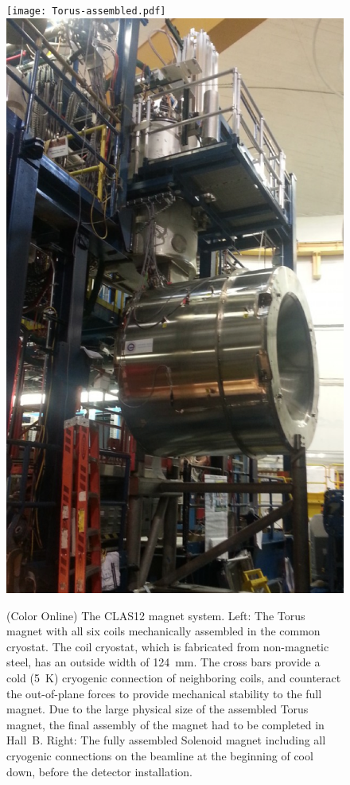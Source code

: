 \documentclass[final,3p,twocolumn]{elsarticle}
\begin{document}
\begin{figure}[htbp!]
\hspace{-0.5cm}\centerline{\texttt{[image: Torus-assembled.pdf]}
\includegraphics[width=0.94\columnwidth]{solenoid-magnet.png}}
\caption{(Color Online) The CLAS12 magnet system. Left: The Torus magnet with all six coils mechanically assembled in the common 
cryostat. The coil cryostat, which is fabricated from non-magnetic steel, has an outside width of 124~mm. The cross
bars provide a cold (5~K) cryogenic connection of neighboring coils, and counteract the out-of-plane forces to provide
mechanical stability to the full magnet. Due to the large physical size of the assembled Torus magnet, the final assembly
of the magnet had to be completed in Hall~B. Right: The fully assembled Solenoid magnet including all cryogenic
connections on the beamline at the beginning of cool down, before the detector installation.}
\label{clas12-magnets}
\end{figure}
\end{document}
